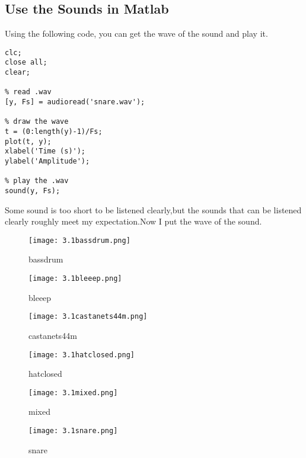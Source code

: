 \documentclass{article}
\begin{document}
\subsection{Use the Sounds in Matlab}
Using the following code, you can get the wave of the sound and play it.
\begin{lstlisting}
clc;
close all;
clear;

% read .wav
[y, Fs] = audioread('snare.wav'); 

% draw the wave
t = (0:length(y)-1)/Fs; 
plot(t, y);
xlabel('Time (s)');
ylabel('Amplitude');

% play the .wav
sound(y, Fs); 
\end{lstlisting}
Some sound is too short to be listened clearly,but 
the sounds that can be listened clearly roughly 
meet my expectation.Now I put the wave of the sound.
\begin{figure}[h]
    \begin{minipage}{0.45\textwidth}
        \centering
        \texttt{[image: 3.1bassdrum.png]}
        \caption{bassdrum}
    \end{minipage}
    \begin{minipage}{0.45\textwidth}
        \centering
        \texttt{[image: 3.1bleeep.png]}
        \caption{bleeep}
    \end{minipage}
    \quad
    \begin{minipage}{0.45\textwidth}
        \centering
        \texttt{[image: 3.1castanets44m.png]}
        \caption{castanets44m}
    \end{minipage}
    \begin{minipage}{0.45\textwidth}
        \centering
        \texttt{[image: 3.1hatclosed.png]}
        \caption{hatclosed}
    \end{minipage}
    \quad
    \begin{minipage}{0.45\textwidth}
        \centering
        \texttt{[image: 3.1mixed.png]}
        \caption{mixed}
    \end{minipage}
    \begin{minipage}{0.45\textwidth}
        \centering
        \texttt{[image: 3.1snare.png]}
        \caption{snare}
    \end{minipage}
\end{figure} 

\newpage
\end{document}
